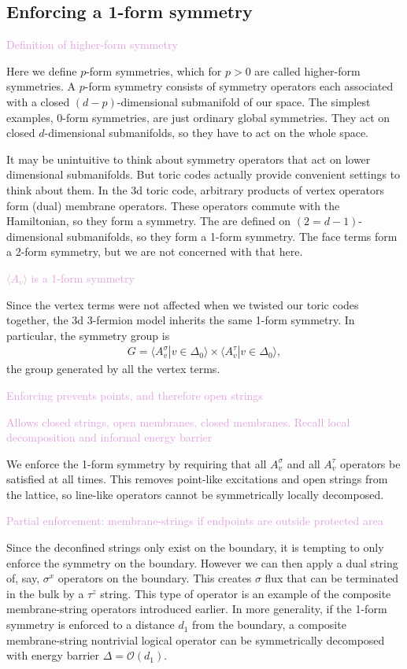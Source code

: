 \documentclass[twocolumn, longbibliography]{revtex4-2}
\newcommand{\outline}[1]{\textcolor{Plum}{#1}}
\begin{document}
\subsection{Enforcing a 1-form symmetry}
	
\outline{Definition of higher-form symmetry}
	
Here we define $p$-form symmetries, which for $p>0$ are called higher-form symmetries. A $p$-form symmetry consists of symmetry operators each associated with a closed $(d-p)$-dimensional submanifold of our space. The simplest examples, 0-form symmetries, are just ordinary global symmetries. They act on closed $d$-dimensional submanifolds, so they have to act on the whole space.
	
It may be unintuitive to think about symmetry operators that act on lower dimensional submanifolds. But toric codes actually provide convenient settings to think about them. In the 3d toric code, arbitrary products of vertex operators form (dual) membrane operators. These operators commute with the Hamiltonian, so they form a symmetry. The are defined on $(2=d-1)$-dimensional submanifolds, so they form a 1-form symmetry. The face terms form a 2-form symmetry, but we are not concerned with that here.
	
\outline{$\langle A_v\rangle$ is a 1-form symmetry}
	
Since the vertex terms were not affected when we twisted our toric codes together, the 3d 3-fermion model inherits the same 1-form symmetry. In particular, the symmetry group is 
\begin{align}
G = \langle A_v^\sigma |v\in \Delta_0 \rangle\times
\langle A_v^\tau |v\in \Delta_0\rangle,
\end{align}
the group generated by all the vertex terms.
	
\outline{Enforcing prevents points, and therefore open strings}
	
\outline{Allows closed strings, open membranes, closed membranes. Recall local decomposition and informal energy barrier}
	
We enforce the 1-form symmetry by requiring that all $A^\sigma_v$ and all $A^\tau_v$ operators be satisfied at all times. This removes point-like excitations and open strings from the lattice, so line-like operators cannot be symmetrically locally decomposed.
	
\outline{Partial enforcement: membrane-strings if endpoints are outside protected area}
	
Since the deconfined strings only exist on the boundary, it is tempting to only enforce the symmetry on the boundary. However we can then apply a dual string of, say, $\sigma^x$ operators on the boundary. This creates $\sigma$ flux that can be terminated in the bulk by a $\tau^z$ string. This type of operator is an example of the composite membrane-string operators introduced earlier. In more generality, if the 1-form symmetry is enforced to a distance $d_1$ from the boundary, a composite membrane-string nontrivial logical operator can be symmetrically decomposed with energy barrier $\Delta=\mathcal{O}(d_1)$.
	
\end{document}
